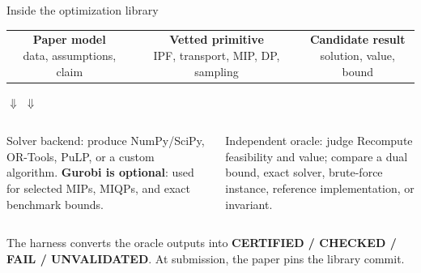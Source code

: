 \documentclass[aspectratio=169,11pt]{beamer}
\begin{document}
\begin{frame}{Inside the optimization library}
  \begin{center}
  \begin{tabular}{c@{\quad$\longrightarrow$\quad}c@{\quad$\longrightarrow$\quad}c}
    \fcolorbox{dtured}{panel}{\parbox{0.21\textwidth}{\centering\textbf{Paper model}\\data, assumptions, claim}}
    &
    \fcolorbox{dtured}{panel}{\parbox{0.24\textwidth}{\centering\textbf{Vetted primitive}\\IPF, transport, MIP, DP, sampling}}
    &
    \fcolorbox{dtured}{panel}{\parbox{0.22\textwidth}{\centering\textbf{Candidate result}\\solution, value, bound}}
  \end{tabular}
  \end{center}
  \vspace{0.8em}
  \begin{center}
    $\Downarrow$ \hspace{0.43\textwidth} $\Downarrow$
  \end{center}
  \vspace{-0.4em}
  \begin{columns}[T]
    \begin{column}{0.47\textwidth}
      \begin{block}{Solver backend: produce}
        NumPy/SciPy, OR-Tools, PuLP, or a custom algorithm. \textbf{Gurobi is optional}: used for selected MIPs, MIQPs, and exact benchmark bounds.
      \end{block}
    \end{column}
    \begin{column}{0.47\textwidth}
      \begin{block}{Independent oracle: judge}
        Recompute feasibility and value; compare a dual bound, exact solver, brute-force instance, reference implementation, or invariant.
      \end{block}
    \end{column}
  \end{columns}
  \vfill
  \centering\small
  The harness converts the oracle outputs into \textbf{CERTIFIED / CHECKED / FAIL / UNVALIDATED}. At submission, the paper pins the library commit.
\end{frame}
\end{document}
